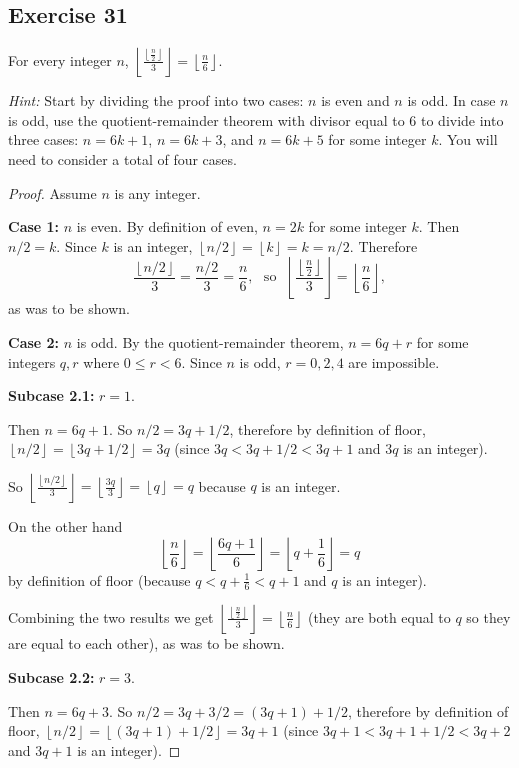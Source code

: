 \documentclass[14pt]{extarticle}
\newcommand{\dps}{\displaystyle}
\newcommand{\floor}[1]{{\left\lfloor#1\right\rfloor}}
\begin{document}
\subsection{Exercise 31}
For every integer $n$, $\dps \floor{\frac{\floor{\frac{n}{2}}}{3}} = \floor{\frac{n}{6}}$.

    {\it Hint:} Start by dividing the proof into two cases: $n$ is even and $n$ is odd. In case $n$ is odd, use the quotient-remainder theorem with divisor equal to 6 to divide into three cases: $n = 6k + 1$, $n = 6k + 3$, and $n = 6k + 5$ for some integer $k$. You will need to consider a total of four cases.

\begin{proof}
    Assume $n$ is any integer.

        {\bf Case 1:} $n$ is even. By definition of even, $n = 2k$ for some integer $k$. Then $n/2 = k$. Since $k$ is an integer, $\floor{n/2} = \floor{k} = k = n/2$. Therefore
    \[
        \frac{\floor{n/2}}{3} = \frac{n/2}{3} = \frac{n}{6}, \,\, \text{ so } \,\, \floor{\frac{\floor{\frac{n}{2}}}{3}} = \floor{\frac{n}{6}},
    \]
    as was to be shown.

        {\bf Case 2:} $n$ is odd. By the quotient-remainder theorem, $n = 6q+r$ for some integers $q,r$ where $0 \leq r < 6$. Since $n$ is odd, $r = 0, 2, 4$ are impossible.

        {\bf Subcase 2.1:} $r = 1$.

    Then $n = 6q+1$. So $n/2 = 3q+1/2$, therefore by definition of floor, $\floor{n/2} = \floor{3q+1/2} = 3q$ (since $3q < 3q+1/2< 3q+1$ and $3q$ is an integer).

    So $\floor{\frac{\floor{n/2}}{3}} = \floor{\frac{3q}{3}} = \floor{q} = q$ because $q$ is an integer.

    On the other hand
    \[
        \floor{\frac{n}{6}} = \floor{\frac{6q+1}{6}} = \floor{q+\frac{1}{6}} = q
    \]
    by definition of floor (because $q < q+\frac{1}{6} < q+1$ and $q$ is an integer).

    Combining the two results we get $ \floor{\frac{\floor{\frac{n}{2}}}{3}} = \floor{\frac{n}{6}}$ (they are both equal to $q$ so they are equal to each other), as was to be shown.

        {\bf Subcase 2.2:} $r = 3$.

    Then $n = 6q+3$. So $n/2 = 3q+3/2 = (3q+1)+1/2$, therefore by definition of floor, $\floor{n/2} = \floor{(3q+1)+1/2} = 3q+1$ (since $3q+1 < 3q+1+1/2< 3q+2$ and $3q+1$ is an integer).


\end{proof}
\end{document}
